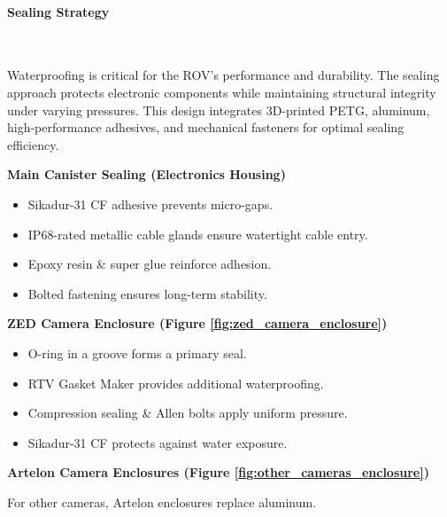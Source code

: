 \vspace{-0.3cm}
\paragraph{Sealing Strategy} \ \\
\vspace{-0.5cm}

Waterproofing is critical for the ROV’s performance and durability. The sealing approach protects electronic components while maintaining structural integrity under varying pressures. This design integrates 3D-printed PETG, aluminum, high-performance adhesives, and mechanical fasteners for optimal sealing efficiency.

\vspace{0.2cm}
\textbf{Main Canister Sealing (Electronics Housing)}

\vspace{-0.5\baselineskip}
\begin{itemize}
    \setlength{\itemsep}{0pt}
    \item Sikadur-31 CF adhesive prevents micro-gaps.
    \item IP68-rated metallic cable glands ensure watertight cable entry.
    \item Epoxy resin \& super glue reinforce adhesion.
    \item Bolted fastening ensures long-term stability.
\end{itemize}

\break

\textbf{ZED Camera Enclosure (Figure \ref{fig:zed_camera_enclosure})}

\vspace{-0.7\baselineskip}
\begin{itemize}
    \setlength{\itemsep}{0pt}
    \item O-ring in a groove forms a primary seal.
    \item RTV Gasket Maker provides additional waterproofing.
    \item Compression sealing \& Allen bolts apply uniform pressure.
    \item Sikadur-31 CF protects against water exposure.
    
\end{itemize}

\textbf{Artelon Camera Enclosures (Figure \ref{fig:other_cameras_enclosure})}

For other cameras, Artelon enclosures replace aluminum.

